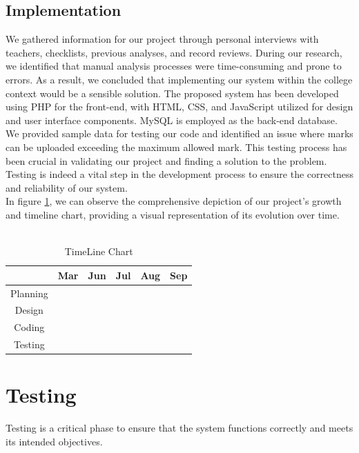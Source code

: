 \documentclass{nascproject}
\begin{document}
\section{Implementation}
	We gathered information for our project through personal interviews with teachers, checklists, previous analyses, and record reviews. During our research, we identified that manual analysis processes were time-consuming and prone to errors. As a result, we concluded that implementing our system within the college context would be a sensible solution. 
The proposed system has been developed using PHP for the front-end, with HTML, CSS, and JavaScript utilized for design and user interface components. MySQL is employed as the back-end database. We provided sample data for testing our code and identified an issue where marks can be uploaded exceeding the maximum allowed mark. This testing process has been crucial in validating our project and finding a solution to the problem. Testing is indeed a vital step in the development process to ensure the correctness and reliability of our system.\\

In figure \ref{timeline}, we can observe the comprehensive depiction of our project's growth and timeline chart, providing a visual representation of its evolution over time. \\ \\
	\begin{table}[h]
		\centering
		\begin{tabular}{|c|c|c|c|c|c|}
			\hline
			& Mar & Jun & Jul & Aug & Sep \\
			\hline
			Planning & \cellcolor{gray!30} & \cellcolor{gray!30} & & &  \\
			\cline{1-2}
			Design & & \cellcolor{gray!30} & \cellcolor{gray!30} & &  \\
			\cline{1-4}
			Coding & & & & \cellcolor{gray!30} & \cellcolor{gray!30}  \\
			\cline{1-6}
			Testing & & & & & \cellcolor{gray!30}  \\
                \hline
		\end{tabular}
	\caption{TimeLine Chart}
	\label{timeline}
	\end{table}

\chapter{Testing}
Testing is a critical phase to ensure that the system functions correctly and meets its intended objectives.
\end{document}
